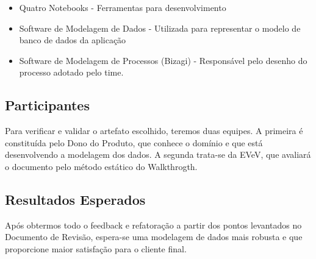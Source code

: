 \begin{itemize}
  \item Quatro Notebooks - Ferramentas para desenvolvimento
  \item Software de Modelagem de Dados - Utilizada para representar o modelo de
  banco de dados da aplicação
  \item Software de Modelagem de Processos (Bizagi) - Responsável pelo desenho do
  processo adotado pelo time.
\end{itemize}

\subsection{Participantes}
Para verificar e validar o artefato escolhido, teremos duas equipes. A primeira é
constituída pelo Dono do Produto, que conhece o domínio e que está desenvolvendo
a modelagem dos dados. A segunda trata-se da EVeV, que avaliará o documento
pelo método estático do Walkthrogth.

\subsection{Resultados Esperados}
Após obtermos todo o feedback e refatoração a partir dos pontos levantados no
Documento de Revisão, espera-se uma modelagem de dados mais robusta e que proporcione
maior satisfação para o cliente final.
